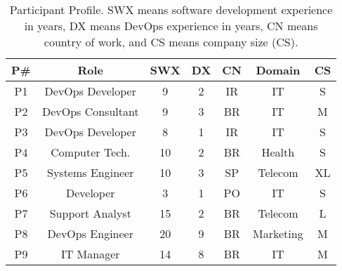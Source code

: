 \begin{table}[t]
\centering
\caption{Participant Profile. SWX means software development experience in years, DX means DevOps experience in years, CN means country of work, and CS means company size (CS).}
\label{participant_table}
\begin{tabular}{ccccccc} \toprule
\textbf{P\#}          & \textbf{Role}
       & \textbf{SWX} & \textbf{DX} & \textbf{CN}   & \textbf{Domain}    & \multicolumn{1}{l}{\textbf{CS}} \\ \midrule
P1                   & DevOps Developer      & 9            & 2           & IR            & IT                 & S                               \\

P2                   & DevOps Consultant       & 9            & 3           & BR            & IT                 & M                               \\

P3                   & DevOps Developer      & 8            & 1           & IR            & IT                 & S                               \\

P4                   & Computer Tech.        & 10           & 2           & BR            & Health             & S                               \\

P5                   & Systems Engineer      & 10           & 3           & SP            & Telecom            & XL                              \\

P6                   & Developer             & 3            & 1           & PO            & IT                 & S                               \\

P7                   & Support Analyst       & 15           & 2           & BR            & Telecom            & L                               \\

P8                   & DevOps Engineer       & 20           & 9           & BR            & Marketing              & M                               \\

P9                   & IT Manager            & 14           & 8           & BR            & IT                 & M                               \\


\end{tabular}
\end{table}
